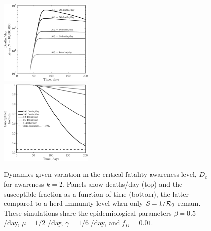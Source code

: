 \begin{figure}[t!]
\begin{center}
\includegraphics[width=0.4\textwidth]{scripts/figseir_Speak_k2_noname.pdf}\\
\includegraphics[width=0.4\textwidth]{scripts/figseir_Susc_k2_noname.pdf}
\caption{Dynamics given variation in the critical fatality awareness
level, $D_c$ for awareness $k=2$. Panels show
deaths/day (top) and the susceptible fraction as a function of time (bottom),
the latter compared to a herd immunity
level when only $S=1/{\cal{R}}_0$ remain.
These simulations share the
epidemiological parameters 
$\beta=0.5$ /day, $\mu=1/2$ /day, $\gamma=1/6$ /day,
and $f_D=0.01$.
\label{fig.generic}}
\end{center}
\end{figure}


